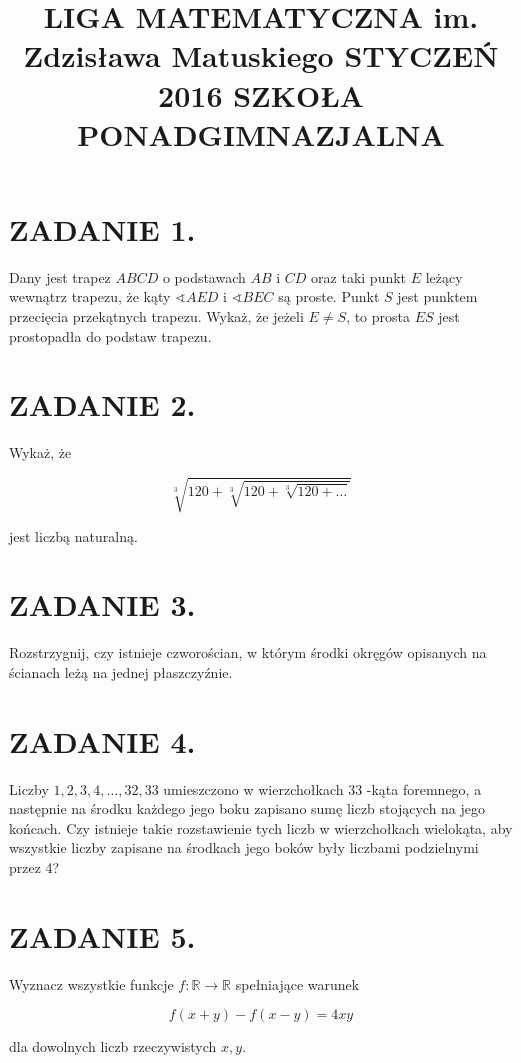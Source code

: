 \documentclass[10pt]{article}
\title{LIGA MATEMATYCZNA im. Zdzisława Matuskiego STYCZEŃ 2016 SZKOŁA PONADGIMNAZJALNA }
\author{}
\date{}
\newcommand\varangle{\mathop{\sphericalangle}}
\begin{document}
\maketitle
\section*{ZADANIE 1.}
Dany jest trapez \(A B C D\) o podstawach \(A B\) i \(C D\) oraz taki punkt \(E\) leżący wewnątrz trapezu, że kąty \(\varangle A E D\) i \(\varangle B E C\) są proste. Punkt \(S\) jest punktem przecięcia przekątnych trapezu. Wykaż, że jeżeli \(E \neq S\), to prosta \(E S\) jest prostopadła do podstaw trapezu.

\section*{ZADANIE 2.}
Wykaż, że

\[
\sqrt[3]{120+\sqrt[3]{120+\sqrt[3]{120+\ldots}}}
\]

jest liczbą naturalną.

\section*{ZADANIE 3.}
Rozstrzygnij, czy istnieje czworościan, w którym środki okręgów opisanych na ścianach leżą na jednej płaszczyźnie.

\section*{ZADANIE 4.}
Liczby \(1,2,3,4, \ldots, 32,33\) umieszczono w wierzchołkach 33 -kąta foremnego, a następnie na środku każdego jego boku zapisano sumę liczb stojących na jego końcach. Czy istnieje takie rozstawienie tych liczb w wierzchołkach wielokąta, aby wszystkie liczby zapisane na środkach jego boków były liczbami podzielnymi przez 4?

\section*{ZADANIE 5.}
Wyznacz wszystkie funkcje \(f: \mathbb{R} \rightarrow \mathbb{R}\) spełniające warunek

\[
f(x+y)-f(x-y)=4 x y
\]

dla dowolnych liczb rzeczywistych \(x, y\).
\end{document}
